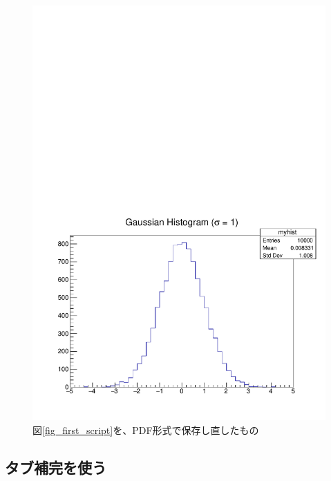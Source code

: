 \begin{figure}
  \centering
  \includegraphics[width=12cm,clip]{fig/first_script_pdf.pdf}
  \caption{図\ref{fig_first_script}を、PDF形式で保存し直したもの}
  \label{fig_first_script_pdf}
\end{figure}

\subsection{タブ補完を使う}

